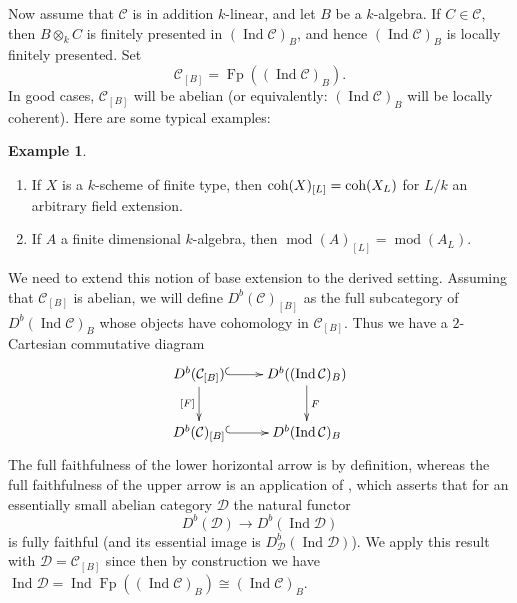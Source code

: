 \documentclass{amsart}
\numberwithin{equation}{section}
\let\cal\mathcal
\theoremstyle{definition}
\newtheorem{examples}[lemmas]{Example}
\theoremstyle{remark}
\begin{document}
Now assume that ${{\cal C}}$ is in addition $k$-linear, and let $B$ be a $k$-algebra. If $C\in {{\cal C}}$, then $B\otimes_k C$ is finitely presented in
$(\operatorname{Ind} {{\cal C}})_B$, and hence $(\operatorname{Ind} {{\cal C}})_B$ is locally finitely presented. Set
\[
{{\cal C}}_{[B]}={\operatorname{Fp}}((\operatorname{Ind}{{\cal C}})_B).
\]
In good cases, ${{\cal C}}_{[B]}$ will be abelian (or equivalently:
$(\operatorname{Ind} {{\cal C}})_B$ will be locally coherent). Here are some typical examples:
\begin{examples}
\begin{enumerate}
\item If  $X$ is a $k$-scheme of finite type, then ${\mathop{\text{\upshape{coh}}}}(X)_{[L]}={\mathop{\text{\upshape{coh}}}}(X_L)$ for $L/k$ an arbitrary field extension.
\item If $A$ a finite dimensional $k$-algebra, then ${\operatorname{mod}}(A)_{[L]}={\operatorname{mod}}(A_L)$.
\end{enumerate}
\end{examples}
We need to extend this notion of base extension to the derived setting. 
Assuming that ${{\cal C}}_{[B]}$ is abelian, we will define $D^b({{\cal C}})_{[B]}$ as the full subcategory of $D^b(\operatorname{Ind} {{\cal C}})_B$ whose objects
 have cohomology in ${{\cal C}}_{[B]}$. Thus we have a $2$-Cartesian commutative diagram
\begin{equation}
\label{ref-5.1-27}
\xymatrix{D^b({{\cal C}}_{[B]})\ar[d]_{[F]}\ar@{^(->}[r] & D^b((\operatorname{Ind} {{\cal C}})_B)\ar[d]^F\\
D^b({{\cal C}})_{[B]}\ar@{^(->}[r] & D^b(\operatorname{Ind} {{\cal C}})_B\\
}
\end{equation}
The full faithfulness of the lower horizontal arrow is by definition, whereas the full faithfulness of the upper arrow is an application of \cite[Prop.\ 2.14]{LowenVdB1}, which asserts that for an essentially small abelian category ${{\cal D}}$
the natural functor
\[
D^b({{\cal D}}){\rightarrow} D^b(\operatorname{Ind} {{\cal D}})
\]
is fully faithful (and its essential image is $D^b_{{\cal D}}(\operatorname{Ind} {{\cal D}})$). We
apply this result with ${{\cal D}}={{\cal C}}_{[B]}$ since then by construction we have
$\operatorname{Ind} {{\cal D}}=\operatorname{Ind}{\operatorname{Fp}} ((\operatorname{Ind}{{\cal C}})_B)
\cong (\operatorname{Ind}{{\cal C}})_B$.
\end{document}
